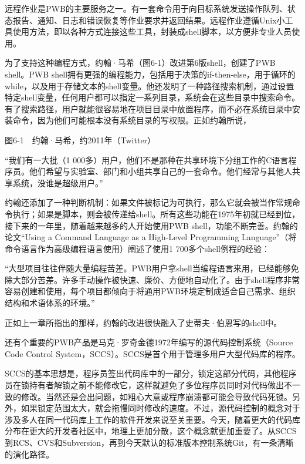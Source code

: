 \documentclass[a4paper,12pt,UTF8,twoside]{ctexbook}
\begin{document}
远程作业是PWB的主要服务之一。有一套命令用于向目标系统发送操作队列、状态报告、通知、日志和错误恢复等作业要求并返回结果。远程作业遵循Unix小工具使用方法，即以各种方式连接这些工具，封装成shell脚本，以方便非专业人员使用。

为了支持这种编程方式，约翰·马希（图6-1）改进第6版shell，创建了PWB shell。PWB shell拥有更强的编程能力，包括用于决策的if-then-else，用于循环的while，以及用于存储文本的shell变量。他还发明了一种路径搜索机制，通过设置特定shell变量，任何用户都可以指定一系列目录，系统会在这些目录中搜索命令。有了搜索路径，用户就能很容易地在项目目录中放置程序，而不必在系统目录中安装命令，因为他们可能根本没有系统目录的写权限。正如约翰所说，



图6-1　约翰·马希，约2011年（Twitter）

“我们有一大批（1 000多）用户，他们不是那种在共享环境下分组工作的C语言程序员。他们希望与实验室、部门和小组共享自己的一套命令。他们经常与其他人共享系统，没谁是超级用户。”



约翰还添加了一种判断机制：如果文件被标记为可执行，那么它就会被当作常规命令执行；如果是脚本，则会被传递给shell。所有这些功能在1975年初就已经到位，接下来的一年里，随着越来越多的人开始使用PWB shell，功能不断完善。约翰的论文“Using a Command Language as a High-Level Programming Language”（将命令语言作为高级编程语言使用）阐述了使用1 700多个shell例程的经验：

“大型项目往往伴随大量编程苦差。PWB用户拿shell当编程语言来用，已经能够免除大部分苦差。许多手动操作被快速、廉价、方便地自动化了。由于shell程序非常容易创建和使用，每个项目都倾向于将通用PWB环境定制成适合自己需求、组织结构和术语体系的环境。”



正如上一章所指出的那样，约翰的改进很快融入了史蒂夫·伯恩写的shell中。

还有个重要的PWB产品是马克·罗奇金德1972年编写的源代码控制系统（Source Code Control System，SCCS）。SCCS是首个用于管理多用户大型代码库的程序。

SCCS的基本思想是，程序员签出代码库中的一部分，锁定这部分代码，其他程序员在锁持有者解锁之前不能修改它，这样就避免了多位程序员同时对代码做出不一致的修改。当然还是会出问题，如粗心大意或程序崩溃都可能会导致代码死锁。另外，如果锁定范围太大，就会拖慢同时修改的速度。不过，源代码控制的概念对于涉及多人在同一代码库上工作的软件开发来说至关重要。今天，随着更大的代码库分布在更大的开发者社区中，地理上更加分散，这个概念就更加重要了。从SCCS到RCS、CVS和Subversion，再到今天默认的标准版本控制系统Git，有一条清晰的演化路径。
\end{document}
